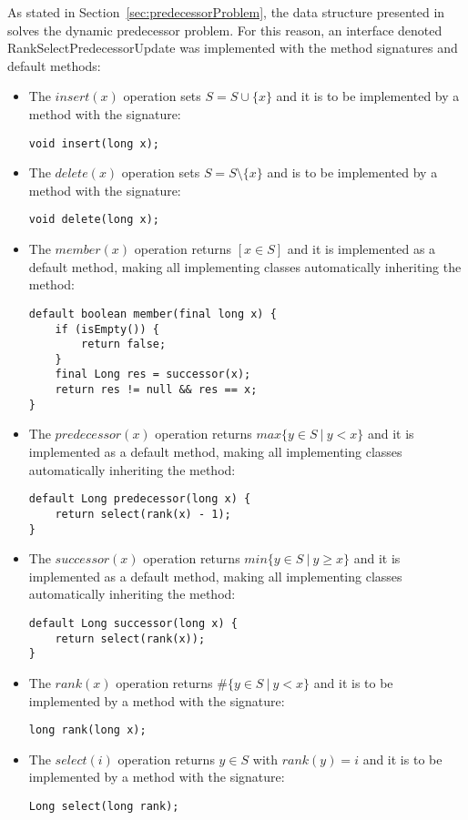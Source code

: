 As stated in Section~\ref{sec:predecessorProblem}, the data structure presented in \cite{patrascu2014dynamic} solves the dynamic predecessor problem. For this reason, an interface denoted {\ttfamily RankSelectPredecessorUpdate} was implemented with the method signatures and default methods:
\begin{itemize}
    \item
    The $insert(x)$ operation sets $S=S \cup \{x\}$ and it is to be implemented by a method with the signature:
    \begin{lstlisting}
void insert(long x);
    \end{lstlisting}
    
    \item
    The $delete(x)$ operation sets $S=S \setminus \{x\}$ and is to be implemented by a method with the signature:
    \begin{lstlisting}
void delete(long x);
    \end{lstlisting}
    
    \item
    The $member(x)$ operation returns $[x \in S]$ and it is implemented as a default method, making all implementing classes automatically inheriting the method:
    \begin{lstlisting}
default boolean member(final long x) {
    if (isEmpty()) {
        return false;
    }
    final Long res = successor(x);
    return res != null && res == x;
}
    \end{lstlisting}

    \item
    The $predecessor(x)$ operation returns $max\{y\in S\ |\ y < x\}$ and it is implemented as a default method, making all implementing classes automatically inheriting the method:
    \begin{lstlisting}
default Long predecessor(long x) {
    return select(rank(x) - 1);
}
    \end{lstlisting}

    \item
    The $successor(x)$ operation returns $min\{y\in S\ |\ y \geq x\}$ and it is implemented as a default method, making all implementing classes automatically inheriting the method:
    \begin{lstlisting}
default Long successor(long x) {
    return select(rank(x));
}
    \end{lstlisting}

    \item
    The $rank(x)$ operation returns $\#\{ y \in S\ |\ y < x\}$ and it is to be implemented by a method with the signature:
    \begin{lstlisting}
long rank(long x);
    \end{lstlisting}

    \item
    The $select(i)$ operation returns $y \in S$ with $rank(y) = i$ and it is to be implemented by a method with the signature:
    \begin{lstlisting}
Long select(long rank);
    \end{lstlisting}
\end{itemize}
